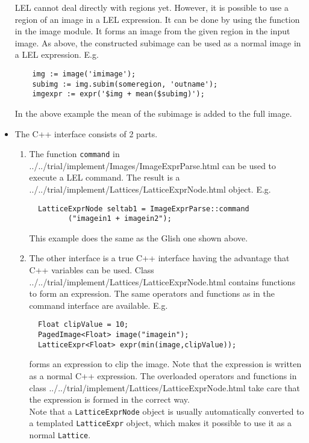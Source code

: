 \begin{itemize}
  LEL cannot deal directly with regions yet. However, it is possible
  to use a region of an image in a LEL expression. It can be
  done by using the 
   function in the image module.
  It forms an image from the given region in the
  input image. As above, the constructed subimage can be used as
  a normal image in a LEL expression. E.g.
  \begin{verbatim}
    img := image('imimage');
    subimg := img.subim(someregion, 'outname');
    imgexpr := expr('$img + mean($subimg)');
  \end{verbatim}
  In the above example the mean of the subimage is added
  to the full image.

\item
  The C++ interface consists of 2 parts.
  \begin{enumerate}
  \item
    The function \texttt{command} in
    {../../trial/implement/Images/ImageExprParse.html}
    can be used to execute a LEL command. The result is a
    {../../trial/implement/Lattices/LatticeExprNode.html}
    object. E.g.
\begin{verbatim}
  LatticeExprNode seltab1 = ImageExprParse::command
         ("imagein1 + imagein2");
\end{verbatim}
    This example does the same as the Glish one shown above.

  \item
    The other interface is a true C++ interface having the
    advantage that C++ variables can be used. Class
    {../../trial/implement/Lattices/LatticeExprNode.html}
    contains functions to form an expression. The same operators
    and functions as in the command interface are available.
    E.g.
\begin{verbatim}
  Float clipValue = 10;
  PagedImage<Float> image("imagein");
  LatticeExpr<Float> expr(min(image,clipValue));
\end{verbatim}
    forms an expression to clip the image. Note that the expression is
    written as a normal C++ expression. The overloaded operators and
    functions in class 
    {../../trial/implement/Lattices/LatticeExprNode.html}
    take care that the expression is formed in the correct way.
    \\Note that a \texttt{LatticeExprNode} object is usually
    automatically converted to a templated \texttt{LatticeExpr} object,
    which makes it possible to use it as a normal \texttt{Lattice}.

  \end{enumerate}
\end{itemize}

